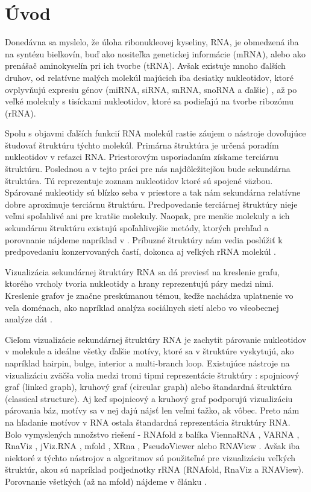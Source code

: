 
\chapter*{Úvod}

Donedávna sa myslelo, že úloha ribonukleovej kyseliny, RNA, je obmedzená
iba na syntézu bielkovín, buď ako nositeľka genetickej informácie (mRNA),
alebo ako prenášač aminokyselín pri ich tvorbe (tRNA).
Avšak existuje mnoho ďalších druhov, od relatívne malých molekúl majúcich
iba desiatky nukleotidov, ktoré ovplyvňujú expresiu génov
(miRNA, siRNA, snRNA, snoRNA a ďalšie)  ,
až po veľké molekuly s tisíckami nukleotidov, ktoré sa podieľajú na tvorbe ribozómu (rRNA).

Spolu s objavmi ďalších funkcií RNA molekúl rastie záujem o nástroje dovoľujúce
študovať štruktúru týchto molekúl.
Primárna štruktúra je určená poradím nukleotidov v reťazci RNA. Priestorovým usporiadaním
získame terciárnu štruktúru. Poslednou a v tejto práci pre nás najdôležitejšou
bude sekundárna štruktúra. Tú reprezentuje zoznam nukleotidov ktoré sú spojené väzbou.
Spárované nukleotidy sú blízko seba v priestore a tak nám sekundárna relatívne
dobre aproximuje terciárnu štruktúru. Predpovedanie terciárnej štruktúry nieje veľmi
spoľahlivé ani pre kratšie molekuly. Naopak, pre menšie molekuly a ich  sekundárnu
štruktúru existujú spoľahlivejšie metódy, ktorých prehľad a porovnanie nájdeme napríklad
v .
Príbuzné štruktúry nám vedia poslúžiť k predpovedaniu konzervovaných častí, dokonca
aj veľkých rRNA molekúl .

Vizualizácia sekundárnej štruktúry RNA sa dá previesť na kreslenie grafu,
ktorého vrcholy tvoria nukleotidy a hrany reprezentujú páry medzi nimi.
Kreslenie grafov je značne preskúmanou témou, keďže nachádza uplatnenie vo veľa
doménach, ako napríklad analýza sociálnych sietí 
alebo vo všeobecnej analýze dát .

Cieľom vizualizácie sekundárnej štruktúry RNA je zachytit párovanie nukleotidov
v molekule a ideálne všetky ďalšie motívy, ktoré sa v štruktúre vyskytujú,
ako napríklad hairpin, bulge, interior a multi-branch loop.
Existujúce nástroje na vizualizáciu zväčša volia medzi tromi tipmi reprezentácie
štruktúry : spojnicový graf (linked graph), kruhový graf (circular graph)
alebo štandardná štruktúra (classical structure).
Aj keď spojnicový a kruhový graf podporujú vizualizáciu párovania báz, motívy
sa v nej dajú nájsť len veľmi ťažko, ak vôbec.
Preto nám na hľadanie motívov v RNA ostala štandardná reprezentácia štruktúry RNA.
Bolo vymyslených množstvo riešení -
RNAfold z balíka ViennaRNA , VARNA ,
RnaViz , jViz.RNA , mfold ,
XRna , PseudoViewer  alebo
RNAView .
Avšak iba niektoré z týchto nástrojov a algoritmov sú použiteľné pre vizualizáciu
veľkých štruktúr, akou sú napríklad podjednotky rRNA (RNAfold, RnaViz a RNAView).
Porovnanie všetkých (až na mfold) nájdeme v článku .

